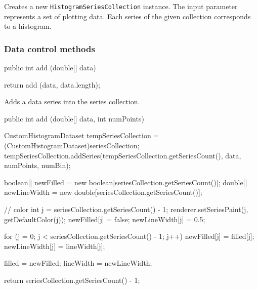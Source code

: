 \begin{tabb}
   Creates a new \texttt{HistogramSeriesCollection} instance.
   The input parameter represents a set of plotting data.
   Each series of the given collection corresponds to a histogram.
\end{tabb}
\begin{htmlonly}
\end{htmlonly}

\subsubsection*{Data control methods}

\begin{code}

   public int add (double[] data) \begin{hide} {
      return add (data, data.length);
   }\end{hide}
\end{code}
\begin{tabb}
   Adds a data series into the series collection.
\end{tabb}
\begin{htmlonly}
\end{htmlonly}
\begin{code}

   public int add (double[] data, int numPoints) \begin{hide} {
      CustomHistogramDataset tempSeriesCollection = (CustomHistogramDataset)seriesCollection;
      tempSeriesCollection.addSeries(tempSeriesCollection.getSeriesCount(),
            data, numPoints, numBin);

      boolean[] newFilled = new boolean[seriesCollection.getSeriesCount()];
      double[] newLineWidth = new double[seriesCollection.getSeriesCount()];

      // color
      int j = seriesCollection.getSeriesCount() - 1;
      renderer.setSeriesPaint(j, getDefaultColor(j));
      newFilled[j] = false;
      newLineWidth[j] = 0.5;

      for (j = 0; j < seriesCollection.getSeriesCount() - 1; j++) {
         newFilled[j] = filled[j];
         newLineWidth[j] = lineWidth[j];
      }

      filled = newFilled;
      lineWidth = newLineWidth;

      return seriesCollection.getSeriesCount() - 1;
   }\end{hide}
\end{code}
